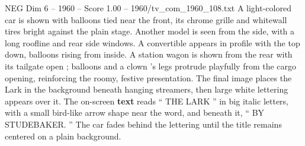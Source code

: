 \begin{textsample}{NEG Dim 6 – 1960 – Score 1.00 – 1960/tv\_com\_1960\_108.txt}
A light-colored car is shown with balloons tied near the front, its chrome grille and whitewall tires bright against the plain stage.
Another model is seen from the side, with a long roofline and rear side windows.
A convertible appears in profile with the top down, balloons rising from inside.
A station wagon is shown from the rear with its tailgate open ; balloons and a clown ’s legs protrude playfully from the cargo opening, reinforcing the roomy, festive presentation.
The final image places the Lark in the background beneath hanging streamers, then large white lettering appears over it.
The on-screen \textbf{text} reads “ THE LARK ” in big italic letters, with a small bird-like arrow shape near the word, and beneath it, “ BY STUDEBAKER. ” The car fades behind the lettering until the title remains centered on a plain background.

\end{textsample}
